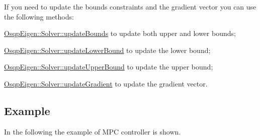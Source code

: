 If you need to update the bounds constraints and the gradient vector you can use the following methods\+:
\begin{DoxyItemize}
\item {\ttfamily \hyperlink{classOsqpEigen_1_1Solver_a1af39f37500a6bad6896e8e6699880fa}{Osqp\+Eigen\+::\+Solver\+::update\+Bounds}} to update both upper and lower bounds;
\item {\ttfamily \hyperlink{classOsqpEigen_1_1Solver_a48764153cec5e618021ab79586cc71b6}{Osqp\+Eigen\+::\+Solver\+::update\+Lower\+Bound}} to update the lower bound;
\item {\ttfamily \hyperlink{classOsqpEigen_1_1Solver_a69f1db45e10dae9c186cc0561532f018}{Osqp\+Eigen\+::\+Solver\+::update\+Upper\+Bound}} to update the upper bound;
\item {\ttfamily \hyperlink{classOsqpEigen_1_1Solver_a7d1d9fdd8db3201a0ca2dcafbc289eea}{Osqp\+Eigen\+::\+Solver\+::update\+Gradient}} to update the gradient vector.
\end{DoxyItemize}\hypertarget{index_results}{}\subsection{Example}\label{index_results}
In the following the example of M\+PC controller is shown. 
